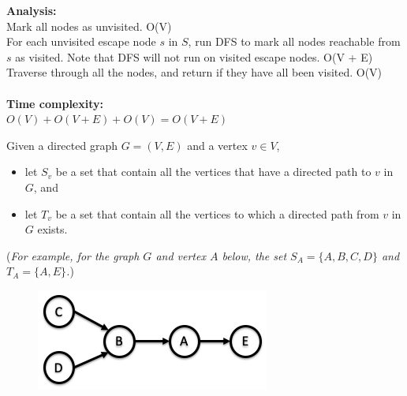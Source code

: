 \documentclass{exam}
\begin{document}
\begin{questions}
{\bf Analysis:}\\
Mark all nodes as unvisited. O(V)\\
For each unvisited escape node $s$ in $S$, run DFS to mark all nodes reachable from $s$ as visited. Note that DFS will not run on visited escape nodes. O(V + E)\\
Traverse through all the nodes, and return if they have all been visited. O(V)\\
\\{\bf Time complexity:}\\
$O(V) + O(V + E) + O(V) = O(V + E)$\\

\newpage



\question Given a directed graph $G = (V, E)$ and a vertex $v \in V$, 
\begin{itemize}
\item let $S_v$ be a set that contain all the vertices that have a directed path to $v$ in $G$, and 
\item let $T_v$ be a set that contain all the vertices to which a directed path from $v$ in $G$ exists.
\end{itemize}
({\it For example, for the graph $G$ and vertex $A$ below, the set $S_A = \{A, B, C, D\}$ and $T_A = \{A, E\}$.})
\begin{figure}[h]
\centering
\includegraphics[scale=0.4]{reach}
\end{figure}



\end{questions}
\end{document}
